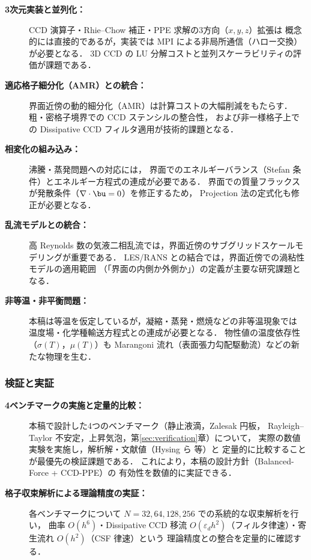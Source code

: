 \begin{description}
  \item[\textbf{3次元実装と並列化：}]
        CCD 演算子・Rhie--Chow 補正・PPE 求解の3方向（$x,y,z$）拡張は
        概念的には直接的であるが，実装では MPI による非局所通信（ハロー交換）が必要となる．
        3D CCD の LU 分解コストと並列スケーラビリティの評価が課題である．

  \item[\textbf{適応格子細分化（AMR）との統合：}]
        界面近傍の動的細分化（AMR）は計算コストの大幅削減をもたらす．
        粗・密格子境界での CCD ステンシルの整合性，
        および非一様格子上での Dissipative CCD フィルタ適用が技術的課題となる．

  \item[\textbf{相変化の組み込み：}]
        沸騰・蒸発問題への対応には，
        界面でのエネルギーバランス（Stefan 条件）とエネルギー方程式の連成が必要である．
        界面での質量フラックスが発散条件（$\nabla\cdot\bu = 0$）を修正するため，
        Projection 法の定式化も修正が必要となる．

  \item[\textbf{乱流モデルとの統合：}]
        高 Reynolds 数の気液二相乱流では，界面近傍のサブグリッドスケールモデリングが重要である．
        LES/RANS との結合では，界面近傍での渦粘性モデルの適用範囲
        （「界面の内側か外側か」）の定義が主要な研究課題となる．

  \item[\textbf{非等温・非平衡問題：}]
        本稿は等温を仮定しているが，凝縮・蒸発・燃焼などの非等温現象では
        温度場・化学種輸送方程式との連成が必要となる．
        物性値の温度依存性（$\sigma(T)$，$\mu(T)$）も
        Marangoni 流れ（表面張力勾配駆動流）などの新たな物理を生む．
\end{description}

\subsubsection{検証と実証}

\begin{description}
  \item[\textbf{4ベンチマークの実施と定量的比較：}]
        本稿で設計した4つのベンチマーク（静止液滴，Zalesak 円板，
        Rayleigh--Taylor 不安定，上昇気泡，第\ref{sec:verification}章）について，
        実際の数値実験を実施し，解析解・文献値（Hysing ら \cite{Hysing2009} 等）と
        定量的に比較することが最優先の検証課題である．
        これにより，本稿の設計方針（Balanced-Force + CCD-PPE）の
        有効性を数値的に実証できる．

  \item[\textbf{格子収束解析による理論精度の実証：}]
        各ベンチマークについて $N = 32, 64, 128, 256$ での系統的な収束解析を行い，
        曲率 $O(h^6)$・Dissipative CCD 移流 $O(\varepsilon_d h^2)$（フィルタ律速）・寄生流れ $O(h^2)$（CSF 律速）という
        理論精度との整合を定量的に確認する．
\end{description}

